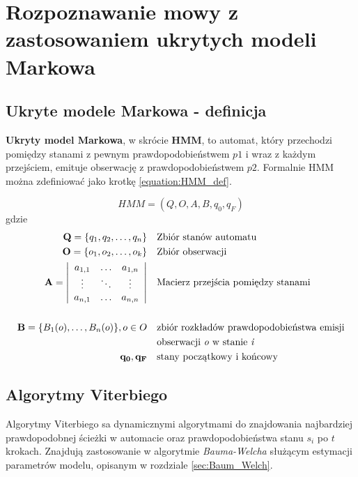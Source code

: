 \documentclass[shortabstract, mgr]{iithesis}
\begin{document}
\section {Rozpoznawanie mowy z zastosowaniem ukrytych modeli Markowa}
	\label{sec:ASR_HMM}
    \subsection{Ukryte modele Markowa - definicja}
	    \label{sec:hmm_def}
    
	    \textbf{Ukryty model Markowa}, w skrócie \textbf{HMM}, to automat, który przechodzi pomiędzy stanami z pewnym prawdopodobieństwem $p1$ i wraz z każdym przejściem, emituje obserwację z prawdopodobieństwem $p2$. Formalnie HMM można zdefiniować jako krotkę \ref{equation:HMM_def}.
	    
	    \begin{equation}
		    HMM = (Q, O, A, B, q_0, q_F)
		    \label{equation:HMM_def}
	    \end{equation}
	    gdzie
	    \begin{align*}
		    \mathbf{Q}=\{q_1, q_2,\ldots,q_n\} & &&  \text{Zbiór stanów automatu} \\
	 	    \mathbf{O}=\{o_1, o_2,\ldots,o_k\} & &&  \text{Zbiór obserwacji} \\
	 	    \mathbf{A} =
	 	    \left| \begin{array}{ccc}
		 	    a_{1,1} & \ldots & a_{1,n} \\
		 	    \vdots  & \ddots & \vdots\\
		 	    a_{n,1} & \ldots & a_{n,n}
	 	    \end{array} \right|
												 	    & &&  \text{Macierz przejścia pomiędzy stanami} \\
												 	    & && \\
	 	    \mathbf{B}=\{B_1(o),\ldots,B_n(o)\},o \in O & && \text{zbiór rozkładów prawdopodobieństwa emisji} \\ 
													 	& && \text{obserwacji \textit{o} w stanie \textit{i}} \\
		 	\mathbf{q_0, q_F}				  & && \text{stany początkowy i końcowy}
	    \end{align*}
	    
	   \subsection{Algorytmy Viterbiego}
		   \label{sec:Viterbi}
		   Algorytmy Viterbiego sa dynamicznymi algorytmami do znajdowania najbardziej prawdopodobnej ścieżki w automacie oraz prawdopodobieństwa stanu $s_i$ po $t$ krokach. Znajdują zastosowanie w algorytmie \textit{Bauma-Welcha} służącym estymacji parametrów modelu, opisanym w rozdziale \ref{sec:Baum_Welch}.
		   
\end{document}
